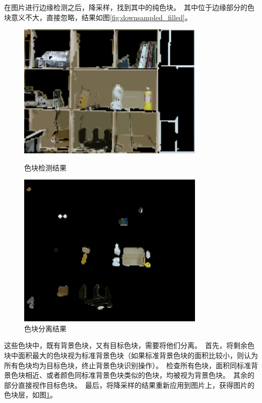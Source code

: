 在图片进行边缘检测之后，降采样，找到其中的纯色块。\ 其中位于边缘部分的色块意义不大，直接忽略，结果如图\ref{fig:downsampled_filled}。\ 

\begin{figure}[H]
\begin{minipage}[t]{0.5\textwidth}
	\centering
    \includegraphics[width = 0.8\textwidth]{images/downsampled_filled.png}
    \caption{色块检测结果}
    \label{fig:downsampled_filled}
\end{minipage}
\begin{minipage}[t]{0.5\textwidth}
	\centering
    \includegraphics[width = 0.8\textwidth]{images/color_block.png}
    \caption{色块分离结果}
    \label{fig:color_block}
\end{minipage}
\end{figure}

这些色块中，既有背景色块，又有目标色块，需要将他们分离。\ 首先，将剩余色块中面积最大的色块视为标准背景色块（如果标准背景色块的面积比较小，则认为所有色块均为目标色块，终止背景色块识别操作）。\ 检查所有色块，面积同标准背景色块相近、或者颜色同标准背景色块类似的色块，均被视为背景色块。\ 其余的部分直接视作目标色块。\ 最后，将降采样的结果重新应用到图片上，获得图片的色块层，如图\ref{fig:color_block}。\ 

